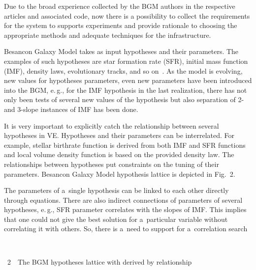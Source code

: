 \begin{multicols}{2}
      Due to the broad experience collected by the BGM authors in the respective 
articles and associated code, now there is a possibility to collect the requirements for 
the system to supports experiments and provide rationale to choosing the appropriate 
methods and adequate techniques for the infrastructure.
      
     Besancon Galaxy
Model takes as input hypotheses and their parameters. The examples of such 
hypotheses are star formation rate (SFR), initial mass function (IMF), density laws, 
evolutionary tracks, and so on~\cite{21-tar}. As the model is evolving, new values for 
hypotheses parameters, even new parameters have been introduced into the BGM, 
e.\,g., for the IMF hypothesis in the last realization, there has not only been tests of 
several new values of the hypothesis but also separation of 2- and 3-slope 
instances of IMF has been done.
      
      It is very important to explicitly catch the relationship between several 
hypotheses in VE. Hypotheses and their parameters can be interrelated. For example, 
stellar birthrate function is derived from both IMF and SFR functions and local 
volume density function is based on the provided density law. The relationships between 
hypotheses put constraints on the tuning of their parameters. 
Besancon Galaxy
Model hypothesis lattice  is depicted in Fig.~2.
      
      The parameters of a~single hypothesis can be linked to each other directly through 
equations. There are also indirect connections of parameters of several hypotheses, 
e.\,g., SFR parameter correlates with the slopes of IMF. This implies that one could 
not give the best solution for a~particular variable without correlating it with others. 
So, there is a~need to support for a~correlation search\linebreak\vspace*{-12pt}

\pagebreak

{ \begin{center}  %
 \vspace*{-6pt}
 \mbox{%
 \epsfxsize=60.589mm 
 }


\end{center}


\noindent
{{\figurename~2}\ \ \small{The BGM hypotheses lattice with derived by relationship}}
}

\vspace*{12pt}


\end{multicols}

